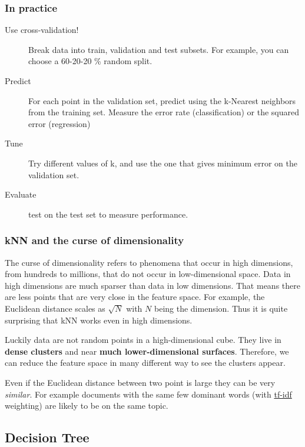 \subsubsection*{In practice}

\begin{description}
 \item[Use cross-validation!] Break data into train, validation and test subsets. For example, you can choose a 60-20-20 \% random split.
 \item[Predict] For each point in the validation set, predict using the k-Nearest neighbors from the training set. Measure the error rate (classification) or the squared error (regression)
 \item[Tune] Try different values of k, and use the one that gives minimum error on the validation set.
 \item[Evaluate] test on the test set to measure performance.
\end{description}

\subsubsection{kNN and the curse of dimensionality}

The curse of dimensionality refers to phenomena that occur in high dimensions, from hundreds to millions, that do not occur in low-dimensional space. Data in high dimensions are much sparser than data in low dimensions. That means there are less points that are very close in the feature space. For example, the Euclidean distance scales as $\sqrt{N}$ with $N$ being the dimension. Thus it is quite surprising that kNN works even in high dimensions. 

Luckily data are not random points in a high-dimensional cube. They live in {\bf dense clusters} and near {\bf much lower-dimensional surfaces}. Therefore, we can reduce the feature space in many different way to see the clusters appear.

Even if the Euclidean distance between two point is large they can be very \emph{similar}. For example documents with the same few dominant words (with \href{https://en.wikipedia.org/wiki/Tf-idf}{tf-idf} weighting) are likely to be on the same topic.

\subsection{Decision Tree}

